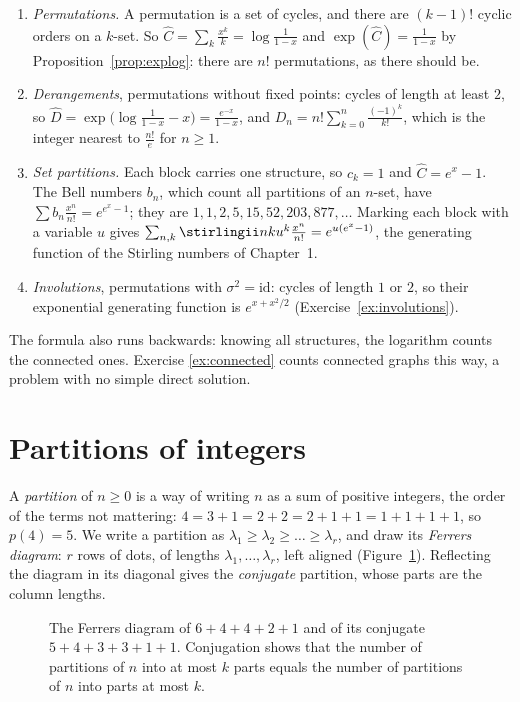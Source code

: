 \begin{example}\label{ex:expformula}
\begin{enumerate}[label=(\alph*)]
\item \emph{Permutations.} A permutation is a set of cycles, and there are $(k-1)!$ cyclic orders on a $k$-set. So
$\hat C=\sum_k\frac{x^k}k=\log\frac1{1-x}$ and $\exp(\hat C)=\frac1{1-x}$ by Proposition~\ref{prop:explog}: there are $n!$
permutations, as there should be.
\item \emph{Derangements}, permutations without fixed points: cycles of length at least $2$, so
$\hat D=\exp\bigl(\log\frac1{1-x}-x\bigr)=\frac{e^{-x}}{1-x}$, and $D_n=n!\sum_{k=0}^n\frac{(-1)^k}{k!}$, which is the integer
nearest to $\frac{n!}e$ for $n\ge1$.
\item \emph{Set partitions.} Each block carries one structure, so $c_k=1$ and $\hat C=e^x-1$. The Bell numbers $b_n$,
which count all partitions of an $n$-set, have $\sum b_n\frac{x^n}{n!}=e^{e^x-1}$; they are $1,1,2,5,15,52,203,877,\dots$
Marking each block with a variable $u$ gives $\sum_{n,k}\stirlingii nk u^k\frac{x^n}{n!}=e^{u(e^x-1)}$, the generating
function of the Stirling numbers of Chapter~1.
\item \emph{Involutions}, permutations with $\sigma^2=\mathrm{id}$: cycles of length $1$ or $2$, so their exponential
generating function is $e^{x+x^2/2}$ (Exercise~\ref{ex:involutions}).
\end{enumerate}
\end{example}

The formula also runs backwards: knowing all structures, the logarithm counts the connected ones. Exercise
\ref{ex:connected} counts connected graphs this way, a problem with no simple direct solution.

\section{Partitions of integers}

A \emph{partition} of $n\ge0$ is a way of writing $n$ as a sum of positive integers, the order of the terms not
mattering: $4=3+1=2+2=2+1+1=1+1+1+1$, so $p(4)=5$. We write a partition as $\lambda_1\ge\lambda_2\ge\dots\ge\lambda_r$, and draw
its \emph{Ferrers diagram}: $r$ rows of dots, of lengths $\lambda_1,\dots,\lambda_r$, left aligned (Figure~\ref{fig:ferrers}).
Reflecting the diagram in its diagonal gives the \emph{conjugate} partition, whose parts are the column lengths.

\begin{figure}[ht]
\centering
{}
\caption{The Ferrers diagram of $6+4+4+2+1$ and of its conjugate $5+4+3+3+1+1$. Conjugation shows that the number of
partitions of $n$ into at most $k$ parts equals the number of partitions of $n$ into parts at most $k$.}
\label{fig:ferrers}
\end{figure}

